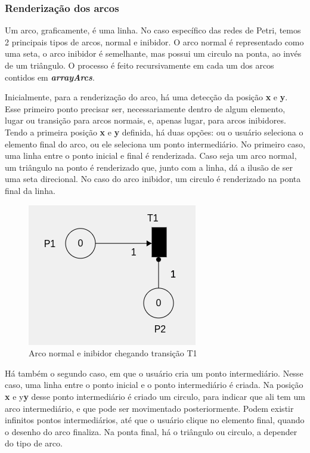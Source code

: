 \documentclass[
	12pt,				%
	openright,			%
	oneside,			%
	a4paper,			%
	english,			%
	brazil				%
	]{abntex2}
\begin{document}
\subsubsection*{Renderização dos arcos}

Um arco, graficamente, é uma linha. No caso específico das redes de Petri, temos 2 principais tipos de arcos, normal e inibidor. O arco normal é representado como uma seta, o arco inibidor é semelhante, mas possui um circulo na ponta, ao invés de um triângulo. O processo é feito recursivamente em cada um dos arcos contidos em \textbf{\textit{arrayArcs}}.



Inicialmente, para a renderização do arco, há uma detecção da posição \textbf{x} e \textbf{y}. Esse primeiro ponto precisar ser, necessariamente dentro de algum elemento, lugar ou transição para arcos normais, e, apenas lugar, para arcos inibidores. Tendo a primeira posição \textbf{x} e \textbf{y} definida, há duas opções: ou o usuário seleciona o elemento final do arco, ou ele seleciona um ponto intermediário. No primeiro caso, uma linha entre o ponto inicial e final é renderizada. Caso seja um arco normal, um triângulo na ponto é renderizado que, junto com a linha, dá a ilusão de ser uma seta direcional. No caso do arco inibidor, um circulo é renderizado na ponta final da linha. 

\begin{figure}[ht] 
	\centering
	\includegraphics[scale=0.7]{figuras/arcNormalInibidor.png}
	\caption[Arco normal e inibidor]{Arco normal e inibidor chegando transição T1}
	\label{fig:arcNormalInibidor}
\end{figure}

Há também o segundo caso, em que o usuário cria um ponto intermediário. Nesse caso, uma linha entre o ponto inicial e o ponto intermediário é criada. Na posição \textbf{x} e y\textbf{y} desse ponto intermediário é criado um circulo, para indicar que ali tem um arco intermediário, e que pode ser movimentado posteriormente. Podem existir infinitos pontos intermediários, até que o usuário clique no elemento final, quando o desenho do arco finaliza. Na ponta final, há o triângulo ou circulo, a depender do tipo de arco. 
\end{document}
